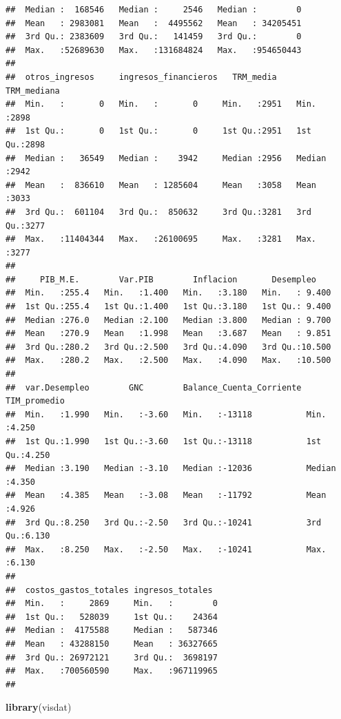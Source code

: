 \documentclass[
  11pt,
]{book}
\newenvironment{Shaded}{\begin{snugshade}}{\end{snugshade}}
\newcommand{\KeywordTok}[1]{\textcolor[rgb]{0.13,0.29,0.53}{\textbf{#1}}}
\newcommand{\NormalTok}[1]{#1}
\begin{document}
\begin{verbatim}
##  Median :  168546   Median :     2546   Median :        0              
##  Mean   : 2983081   Mean   :  4495562   Mean   : 34205451              
##  3rd Qu.: 2383609   3rd Qu.:   141459   3rd Qu.:        0              
##  Max.   :52689630   Max.   :131684824   Max.   :954650443              
##                                                                        
##  otros_ingresos     ingresos_financieros   TRM_media     TRM_mediana  
##  Min.   :       0   Min.   :       0     Min.   :2951   Min.   :2898  
##  1st Qu.:       0   1st Qu.:       0     1st Qu.:2951   1st Qu.:2898  
##  Median :   36549   Median :    3942     Median :2956   Median :2942  
##  Mean   :  836610   Mean   : 1285604     Mean   :3058   Mean   :3033  
##  3rd Qu.:  601104   3rd Qu.:  850632     3rd Qu.:3281   3rd Qu.:3277  
##  Max.   :11404344   Max.   :26100695     Max.   :3281   Max.   :3277  
##                                                                       
##     PIB_M.E.        Var.PIB        Inflacion       Desempleo     
##  Min.   :255.4   Min.   :1.400   Min.   :3.180   Min.   : 9.400  
##  1st Qu.:255.4   1st Qu.:1.400   1st Qu.:3.180   1st Qu.: 9.400  
##  Median :276.0   Median :2.100   Median :3.800   Median : 9.700  
##  Mean   :270.9   Mean   :1.998   Mean   :3.687   Mean   : 9.851  
##  3rd Qu.:280.2   3rd Qu.:2.500   3rd Qu.:4.090   3rd Qu.:10.500  
##  Max.   :280.2   Max.   :2.500   Max.   :4.090   Max.   :10.500  
##                                                                  
##  var.Desempleo        GNC        Balance_Cuenta_Corriente  TIM_promedio  
##  Min.   :1.990   Min.   :-3.60   Min.   :-13118           Min.   :4.250  
##  1st Qu.:1.990   1st Qu.:-3.60   1st Qu.:-13118           1st Qu.:4.250  
##  Median :3.190   Median :-3.10   Median :-12036           Median :4.350  
##  Mean   :4.385   Mean   :-3.08   Mean   :-11792           Mean   :4.926  
##  3rd Qu.:8.250   3rd Qu.:-2.50   3rd Qu.:-10241           3rd Qu.:6.130  
##  Max.   :8.250   Max.   :-2.50   Max.   :-10241           Max.   :6.130  
##                                                                          
##  costos_gastos_totales ingresos_totales   
##  Min.   :     2869     Min.   :        0  
##  1st Qu.:   528039     1st Qu.:    24364  
##  Median :  4175588     Median :   587346  
##  Mean   : 43288150     Mean   : 36327665  
##  3rd Qu.: 26972121     3rd Qu.:  3698197  
##  Max.   :700560590     Max.   :967119965  
## 
\end{verbatim}

\begin{Shaded}
\begin{Highlighting}[]
\KeywordTok{library}\NormalTok{(visdat)}
\end{Highlighting}
\end{Shaded}
\end{document}
